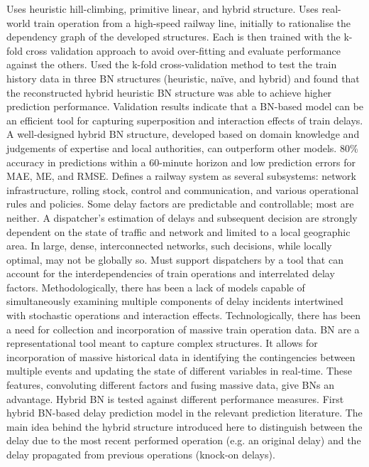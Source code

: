 \documentclass{article}
\begin{document}
Uses heuristic hill-climbing, primitive linear, and hybrid structure. Uses real-world train operation from a high-speed railway line, initially to rationalise the dependency graph of the developed structures. Each is then trained with the k-fold cross validation approach to avoid over-fitting and evaluate performance against the others.
Used the k-fold cross-validation method to test the train history data in three BN structures (heuristic, naïve, and hybrid) and found that the reconstructed hybrid heuristic BN structure was able to achieve higher prediction performance.
Validation results indicate that a BN-based model can be an efficient tool for capturing superposition and interaction effects of train delays. A well-designed hybrid BN structure, developed based on domain knowledge and judgements of expertise and local authorities, can outperform other models. 80\% accuracy in predictions within a 60-minute horizon and low prediction errors for MAE, ME, and RMSE.
Defines a railway system as several subsystems: network infrastructure, rolling stock, control and communication, and various operational rules and policies. 
Some delay factors are predictable and controllable; most are neither. 
A dispatcher’s estimation of delays and subsequent decision are strongly dependent on the state of traffic and network and limited to a local geographic area. In large, dense, interconnected networks, such decisions, while locally optimal, may not be globally so. Must support dispatchers by a tool that can account for the interdependencies of train operations and interrelated delay factors.
Methodologically, there has been a lack of models capable of simultaneously examining multiple components of delay incidents intertwined with stochastic operations and interaction effects. Technologically, there has been a need for collection and incorporation of massive train operation data. 
BN are a representational tool meant to capture complex structures. It allows for incorporation of massive historical data in identifying the contingencies between multiple events and updating the state of different variables in real-time. These features, convoluting different factors and fusing massive data, give BNs an advantage.
Hybrid BN is tested against different performance measures. First hybrid BN-based delay prediction model in the relevant prediction literature. The main idea behind the hybrid structure introduced here to distinguish between the delay due to the most recent performed operation (e.g. an original delay) and the delay propagated from previous operations (knock-on delays).
\end{document}
